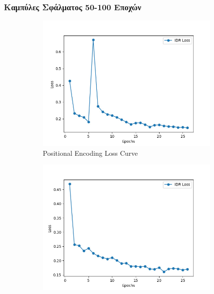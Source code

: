     \subsubsection{Καμπύλες Σφάλματος 50-100 Εποχών}
    \begin{figure}[H]
      \centering
      \begin{subfigure}{0.3\textwidth}
        \includegraphics[width=\linewidth]{images/chapter5_img/LossPlots/Total_Loss_First_50-100_Epochs/loss_plot_PositionalEncoding.jpg}
        \caption*{Positional Encoding Loss Curve}
      \end{subfigure}
      \begin{subfigure}{0.3\textwidth}
        \includegraphics[width=\linewidth]{images/chapter5_img/LossPlots/Total_Loss_First_50-100_Epochs/loss_plot_FourierFeatures.jpg}

\end{subfigure}
\end{figure}
